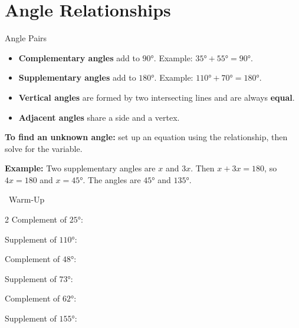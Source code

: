 \section{Angle Relationships}

\begin{quickReview}{Angle Pairs}
\begin{itemize}[leftmargin=*]
    \item \textbf{Complementary angles} add to $90°$. \quad Example: $35° + 55° = 90°$.
    \item \textbf{Supplementary angles} add to $180°$. \quad Example: $110° + 70° = 180°$.
    \item \textbf{Vertical angles} are formed by two intersecting lines and are always \textbf{equal}.
    \item \textbf{Adjacent angles} share a side and a vertex.
\end{itemize}

\medskip
\textbf{To find an unknown angle:} set up an equation using the relationship, then solve for the variable.

\smallskip
\textbf{Example:} Two supplementary angles are $x$ and $3x$. Then $x + 3x = 180$, so $4x = 180$ and $x = 45°$. The angles are $45°$ and $135°$.
\end{quickReview}

\begin{practiceBox}[funGreen]{\faSun~Warm-Up}


\begin{multicols}{2}
\prob Complement of $25°$: \answerBlank[2cm]

\prob Supplement of $110°$: \answerBlank[2cm]

\prob Complement of $48°$: \answerBlank[2cm]

\prob Supplement of $73°$: \answerBlank[2cm]

\prob Complement of $62°$: \answerBlank[2cm]

\prob Supplement of $155°$: \answerBlank[2cm]
\end{multicols}
\end{practiceBox}

